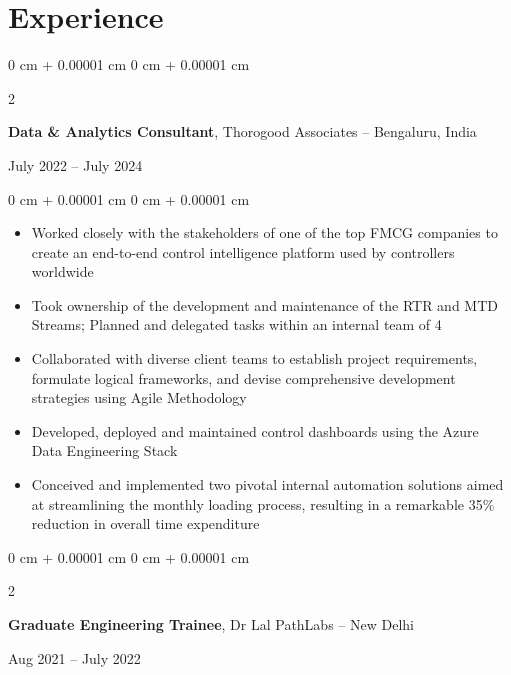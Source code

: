 \documentclass[10pt, letterpaper]{article}
\newenvironment{highlights}{
    \begin{itemize}[
        topsep=0.10 cm,
        parsep=0.10 cm,
        partopsep=0pt,
        itemsep=0pt,
        leftmargin=0 cm + 10pt
    ]
}{
    \end{itemize}
} %
\newenvironment{onecolentry}{
    \begin{adjustwidth}{
        0 cm + 0.00001 cm
    }{
        0 cm + 0.00001 cm
    }
}{
    \end{adjustwidth}
} %
\newenvironment{twocolentry}[2][]{
    \onecolentry
    \def\secondColumn{#2}
    \setcolumnwidth{\fill, 4.5 cm}
    \begin{paracol}{2}
}{
    \switchcolumn \raggedleft \secondColumn
    \end{paracol}
    \endonecolentry
} %
\begin{document}
    \section{Experience}

    \begin{twocolentry}{July 2022 – July 2024}
    \textbf{Data \& Analytics Consultant}, Thorogood Associates -- Bengaluru, India
    \end{twocolentry}
    
    \vspace{0.10 cm}
    \begin{onecolentry}
    \begin{highlights}
        \item Worked closely with the stakeholders of one of the top FMCG companies to create an end-to-end control intelligence platform used by controllers worldwide
        \item Took ownership of the development and maintenance of the RTR and MTD Streams; Planned and delegated tasks within an internal team of 4 
        \item Collaborated with diverse client teams to establish project requirements, formulate logical frameworks, and devise comprehensive development strategies using Agile Methodology
        \item Developed, deployed and maintained control dashboards using the Azure Data Engineering Stack
        \item Conceived and implemented two pivotal internal automation solutions aimed at streamlining the monthly loading process, resulting in a remarkable 35\% reduction in overall time expenditure
    \end{highlights}
    \end{onecolentry}
    
    \vspace{0.2 cm}
    
    \begin{twocolentry}{Aug 2021 – July 2022}
    \textbf{Graduate Engineering Trainee}, Dr Lal PathLabs -- New Delhi
    \end{twocolentry}
    
\end{document}

